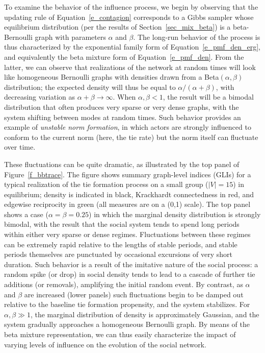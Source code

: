 \documentclass[11pt]{article}
\begin{document}
To examine the behavior of the influence process, we begin by observing that the updating rule of Equation~\ref{e_contagion} corresponds to a Gibbs sampler whose equilibrium distribution (per the results of Section~\ref{sec_mix_beta}) is a beta-Bernoulli graph with parameters $\alpha$ and $\beta$.  The long-run behavior of the process is thus characterized by the exponential family form of Equation~\ref{e_pmf_den_erg}, and equivalently the beta mixture form of Equation~\ref{e_pmf_den}.  From the latter, we can observe that realizations of the network at random times will look like homogeneous Bernoulli graphs with densities drawn from a Beta$(\alpha,\beta)$ distribution; the expected density will thus be equal to $\alpha/(\alpha+\beta)$, with decreasing variation as $\alpha+\beta \to \infty$.  When $\alpha,\beta<1$, the result will be a bimodal distribution that often produces very sparse or very dense graphs, with the system shifting between modes at random times.  Such behavior provides an example of \emph{unstable norm formation}, in which actors are strongly influenced to conform to the current norm (here, the tie rate) but the norm itself can fluctuate over time.

These fluctuations can be quite dramatic, as illustrated by the top panel of Figure~\ref{f_bbtrace}.  The figure shows summary graph-level indices (GLIs) for a typical realization of the tie formation process on a small group ($|V|=15$) in equilibrium; density is indicated in black, Krackhardt connectedness \citep{krackhardt:ch:1994} in red, and edgewise reciprocity in green (all measures are on a (0,1) scale).  The top panel shows a case ($\alpha=\beta=0.25$) in which the marginal density distribution is strongly bimodal, with the result that the social system tends to spend long periods within either very sparse or dense regimes.  Fluctuations between these regimes can be extremely rapid relative to the lengths of stable periods, and stable periods themselves are punctuated by occasional excursions of very short duration.  Such behavior is a result of the imitative nature of the social process: a random spike (or drop) in social density tends to lead to a cascade of further tie additions (or removals), amplifying the initial random event.  By contrast, as $\alpha$ and $\beta$ are increased (lower panels) such fluctuations begin to be damped out relative to the baseline tie formation propensity, and the system stabilizes.  For $\alpha,\beta \gg 1$, the marginal distribution of density is approximately Gaussian, and the system gradually approaches a homogeneous Bernoulli graph.  By means of the beta mixture representation, we can thus easily characterize the impact of varying levels of influence on the evolution of the social network.
\end{document}
